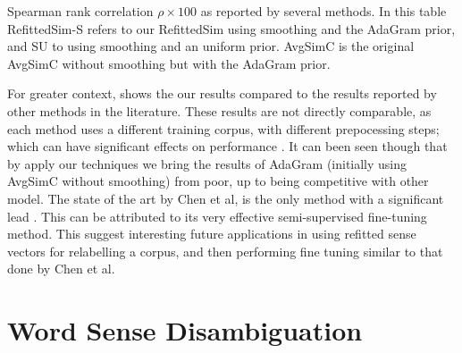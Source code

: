 \documentclass{sig-alternate}
\begin{document}
\begin{table}
	\begin{adjustbox}{max width=\columnwidth}
	\end{adjustbox}
	\caption{Spearman rank correlation $\rho \times 100$  as reported by several methods\label{swscEvery}. In this table RefittedSim-S refers to our RefittedSim using smoothing and the AdaGram prior, and SU to using smoothing and an uniform prior. AvgSimC is the original AvgSimC without smoothing but with the AdaGram prior.}
\end{table}

For greater context,  shows the our results compared to the results reported by other methods in the literature. These results are not directly comparable, as each method uses a different training corpus, with different prepocessing steps;  which can have significant effects on performance .
It can been seen though that by apply our techniques we bring the results of AdaGram (initially using AvgSimC without smoothing) from poor, up to being competitive with other model. The state of the art by Chen et al, is the only method with a significant lead \parencite{Chen2014}. This can be attributed to its very effective semi-supervised fine-tuning method. This suggest interesting future applications in using refitted sense vectors for relabelling a corpus, and then performing fine tuning similar to that done by Chen et al.



\section{Word Sense Disambiguation}
\end{document}

